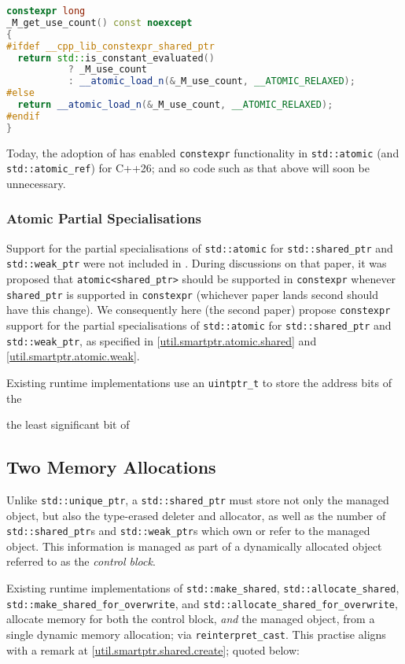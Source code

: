 \documentclass[10pt]{article}
\newcommand*{\wgxxi}[1]{[\href{https://wg21.link/#1}{#1}]}
\begin{document}
\begin{lstlisting}[language=cpp]
constexpr long
_M_get_use_count() const noexcept
{
#ifdef __cpp_lib_constexpr_shared_ptr
  return std::is_constant_evaluated()
           ? _M_use_count
           : __atomic_load_n(&_M_use_count, __ATOMIC_RELAXED);
#else
  return __atomic_load_n(&_M_use_count, __ATOMIC_RELAXED);
#endif
}
\end{lstlisting}

Today, the adoption of \cite{P3309R3} has enabled \texttt{constexpr}
functionality in \texttt{std::atomic} (and \texttt{std::atomic\_ref}) for
C++26; and so code such as that above will soon be unnecessary.

\subsubsection{Atomic Partial Specialisations}

Support for the partial specialisations of
\texttt{std::atomic} for \texttt{std::shared\_ptr} and \texttt{std::weak\_ptr}
were not included in \cite{P3309R3}. During discussions on that paper, it was
proposed that \texttt{atomic<shared\_ptr>} should be supported in
\texttt{constexpr} whenever \texttt{shared\_ptr} is supported in
\texttt{constexpr} (whichever paper lands second should have this change). We
consequently here (the second paper) propose \texttt{constexpr} support for the
partial specialisations of \texttt{std::atomic} for \texttt{std::shared\_ptr}
and \texttt{std::weak\_ptr}, as specified in
\wgxxi{util.smartptr.atomic.shared} and \wgxxi{util.smartptr.atomic.weak}.

Existing runtime implementations use
an \texttt{uintptr\_t} to store the address bits of the

the least significant bit of

\subsection{Two Memory Allocations}

Unlike \texttt{std::unique\_ptr}, a \texttt{std::shared\_ptr} must store not
only the managed object, but also the type-erased deleter and allocator, as
well as the number of \texttt{std::shared\_ptr}s and \texttt{std::weak\_ptr}s
which own or refer to the managed object. This information is managed as part
of a dynamically allocated object referred to as the \emph{control block}.

Existing runtime implementations of \texttt{std::make\_shared},
\texttt{std::allocate\_shared}, \linebreak
\texttt{std::make\_shared\_for\_overwrite}, and
\texttt{std::allocate\_shared\_for\_overwrite}, allocate memory for both the
control block, \emph{and} the managed object, from a single dynamic memory
allocation; via \texttt{reinterpret\_cast}.  This practise aligns with a remark
at \wgxxi{util.smartptr.shared.create}; quoted below:
\end{document}
